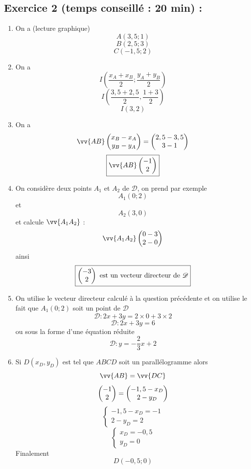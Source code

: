 \subsection*{Exercice 2 (temps conseillé : 20 min) : }
\begin{enumerate}
\item On a (lecture graphique) 
$$\boxed{A(3,5;1)}$$
$$\boxed{B(2,5;3)}$$
$$\boxed{C(-1,5;2)}$$
\item On a $$I\left(\frac{x_A + x_B}{2}; \frac{y_A+y_B}{2}\right)$$
$$I\left(\frac{3,5 + 2,5}{2},\frac{1+3}{2}\right)$$
$$\boxed{I(3,2)}$$
\item On a $$\vv{AB} \covec{x_B-x_A}{y_B - y_A} = \covec{2,5-3,5}{3-1}$$
$$\boxed{\vv{AB} \covec{-1}{2}}$$
\item On considère deux points $A_1$ et $A_2$ de $\mathscr{D}$, on prend par exemple $$A_1 (0;2)$$ et $$A_2(3,0)$$ et calcule $\vv{A_1A_2}$ : $$\vv{A_1A_2} \covec{0-3}{2-0}$$ ainsi $$\boxed{\begin{pmatrix}-3 \\2 \end{pmatrix} \text{ est un vecteur directeur de } \mathscr{D}}$$
\item On utilise le vecteur directeur calculé à la question précédente et on utilise le fait que $A_1 (0;2)$ soit un point de $\mathscr{D}$ 
$$\mathscr{D} : 2x + 3y = 2\times 0 + 3\times 2$$
$$\boxed{\mathscr{D} : 2x + 3y = 6}$$
ou sous la forme d'une équation réduite
$$\boxed{\mathscr{D} : y = -\frac{2}{3}x+2}$$
\item Si $D(x_D,y_D)$ est tel que $ABCD$ soit un parallélogramme alors $$\vv{AB} = \vv{DC}$$
$$\begin{pmatrix}-1 \\2 \end{pmatrix} = \begin{pmatrix}-1,5 -x_D \\2-y_D \end{pmatrix}$$
$$\left\{\begin{array}{l} -1,5 -x_D = -1\\ 2-y_D = 2\end{array}\right.$$
$$\left\{\begin{array}{l} x_D = -0,5\\ y_D = 0\end{array}\right.$$
Finalement 
$$\boxed{D(-0,5;0)}$$
\end{enumerate}
